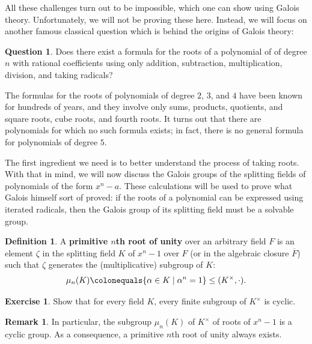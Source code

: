 \documentclass[12pt]{report}
\numberwithin{equation}{section}
\numberwithin{theorem}{chapter}
\theoremstyle{definition}
\newtheorem{definition}[theorem]{Definition}
\newtheorem{question}[theorem]{Question}
\newtheorem{exercise}{Exercise}
\newtheorem*{basic properties}{Basic Properties}
\newtheorem*{Important Remark}{Important Remark}
\newtheorem{remark}[theorem]{Remark}
\newcommand{\df}[1]{{\bf #1}\index{#1}}
\begin{document}
All these challenges turn out to be impossible, which one can show using Galois theory. Unfortunately, we will not be proving these here. Instead, we will focus on another famous classical question which is behind the origins of Galois theory:

\begin{question}
	Does there exist a formula for the roots of a polynomial of of degree $n$ with rational coefficients using only addition, subtraction, multiplication, division, and taking radicals?
\end{question}

The formulas for the roots of polynomials of degree $2$, $3$, and $4$ have been known for hundreds of years, and they involve only sums, products, quotients, and square roots, cube roots, and fourth roots. It turns out that there are polynomials for which no such formula exists; in fact, there is no general formula for polynomials of degree $5$.

The first ingredient we need is to better understand the process of taking roots. With that in mind, we will now discuss the Galois groups of the splitting fields of polynomials of the form $x^n - a$. These calculations will be used to prove what Galois himself sort of proved: if the roots of a polynomial can be expressed using iterated radicals, then the Galois group of its splitting field must be a solvable group.






\begin{definition}
A \df{primitive $n$th root of unity} over an arbitrary field $F$ is an element $\zeta$ in the splitting field $K$ of $x^n - 1$ over $F$ (or in the algebraic closure $\overline{F}$) such that $\zeta$ generates the (multiplicative) subgroup of $K$:
$$\mu_n(K) \colonequals \{\alpha \in K \mid \alpha^n = 1\} \leq (K^\times, \cdot).$$
\end{definition}

\begin{exercise}
	Show that for every field $K$, every finite subgroup of $K^\times$ is cyclic.
\end{exercise}


\begin{remark}
	In particular, the subgroup $\mu_n(K)$ of $K^\times$ of roots of $x^n-1$ is a cyclic group. As a consequence, a primitive $n$th root of unity always exists.
\end{remark}
\end{document}
